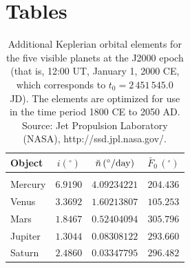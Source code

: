 \section{Tables}
\begin{table}[!h]\centering
\begin{tabular}{l|ccc}
Object &  $i(^\circ)$& $\breve{n}\,(^\circ/{\rm day})$ & $\bar{F}_0\,(^\circ)$\\\hline
&&&\\[-2.2ex]
Mercury &  $6.9190$ & $4.09234221$ & $204.436$\\
Venus     &  $3.3692$ & $1.60213807$ & $105.253$ \\
Mars      &  $1.8467$  & $0.52404094$ & $305.796$ \\
Jupiter   &  $1.3044$  & $0.08308122$ & $293.660$ \\
Saturn   &  $2.4860$  & $0.03347795$ & $296.482$ \\
\end{tabular}
\caption{Additional Keplerian orbital elements for  the five visible planets at the J2000 epoch (that is, 12:00 UT, January 1, 2000 CE,
which corresponds to $t_0 = 2\,451\,545.0$ JD). The elements are optimized for use in the
time period 1800 CE to 2050 AD. Source: Jet Propulsion Laboratory (NASA), {http://ssd.jpl.nasa.gov/}. }\label{tadd}
\end{table}

